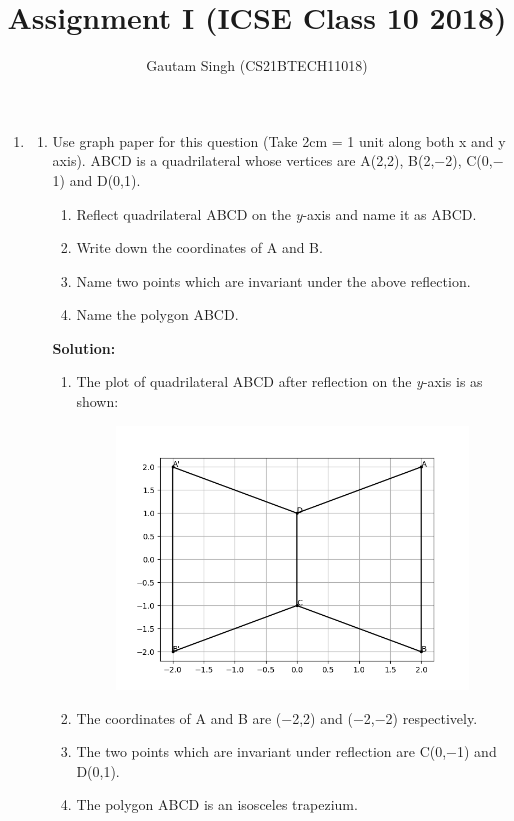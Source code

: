 \documentclass[journal,12pt,twocolumn]{IEEEtran}
\newcommand{\solution}{\noindent \textbf{Solution: }}
\begin{document}
\vspace{3cm}
\title{Assignment I (ICSE Class 10 2018)}
\author{Gautam Singh (CS21BTECH11018)}
\maketitle
\begin{enumerate}[label=\arabic{enumi}. , start = 5]
\item
\begin{enumerate}[label=\alph{enumii}. , start = 3]
\item Use graph paper for this question (Take 2cm = 1 unit along both x and y axis). ABCD is a quadrilateral whose vertices are A(2,2), B(2,$-$2), C(0,$-$1) and D(0,1).
\begin{enumerate}[label=(\roman{enumiii})]
\item Reflect quadrilateral ABCD on the \textit{y}-axis and name it as A\textquotesingle B\textquotesingle CD.
\item Write down the coordinates of A{\textquotesingle} and B\textquotesingle .
\item Name two points which are invariant under the above reflection.
\item Name the polygon A\textquotesingle B\textquotesingle CD.
\end{enumerate}
\solution 
\begin{enumerate}[label=(\roman{enumiii})]
\item The plot of quadrilateral ABCD after reflection on the \textit{y}-axis is as shown:
\begin{figure}[h]
\centering
\includegraphics[scale=0.5]{./figs/graph.png}
\end{figure}
\item The coordinates of A{\textquotesingle} and B{\textquotesingle} are ($-$2,2) and ($-$2,$-$2) respectively.
\item The two points which are invariant under reflection are C(0,$-$1) and D(0,1).
\item The polygon A\textquotesingle B\textquotesingle CD is an isosceles trapezium.
\end{enumerate}
\end{enumerate}
\end{enumerate}
\end{document}
